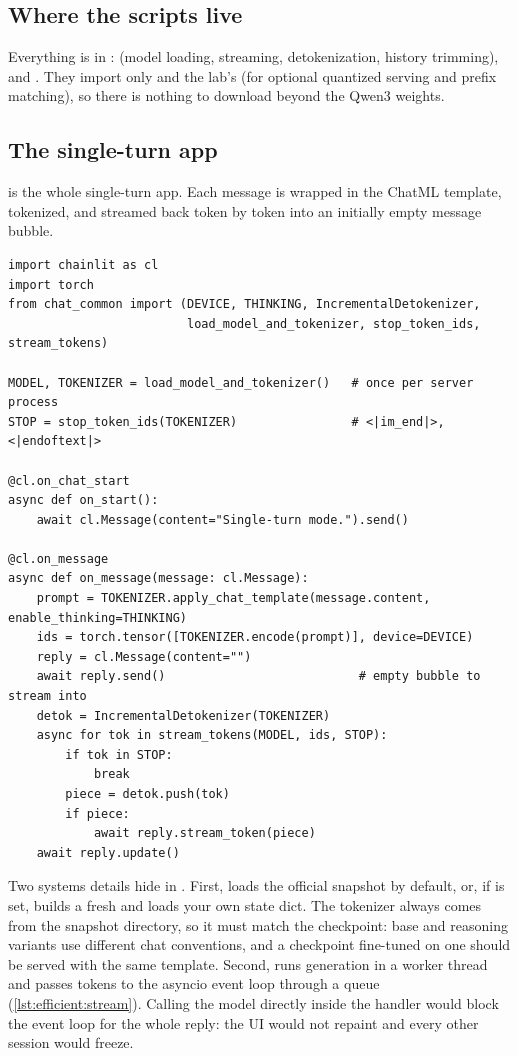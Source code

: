 \subsection{Where the scripts live}
Everything is in :  (model
loading, streaming, detokenization, history trimming),  and
. They import only  and the lab's
 (for optional quantized serving and prefix matching), so there is
nothing to download beyond the Qwen3 weights.

\subsection{The single-turn app}
 is the whole single-turn app. Each message is wrapped in the
ChatML template, tokenized, and streamed back token by token into an initially empty
message bubble.

\begin{lstlisting}[caption={\ident{chat_single_turn.py}: every message is answered
independently.},label={lst:efficient:single}]
import chainlit as cl
import torch
from chat_common import (DEVICE, THINKING, IncrementalDetokenizer,
                         load_model_and_tokenizer, stop_token_ids, stream_tokens)

MODEL, TOKENIZER = load_model_and_tokenizer()   # once per server process
STOP = stop_token_ids(TOKENIZER)                # <|im_end|>, <|endoftext|>

@cl.on_chat_start
async def on_start():
    await cl.Message(content="Single-turn mode.").send()

@cl.on_message
async def on_message(message: cl.Message):
    prompt = TOKENIZER.apply_chat_template(message.content, enable_thinking=THINKING)
    ids = torch.tensor([TOKENIZER.encode(prompt)], device=DEVICE)
    reply = cl.Message(content="")
    await reply.send()                           # empty bubble to stream into
    detok = IncrementalDetokenizer(TOKENIZER)
    async for tok in stream_tokens(MODEL, ids, STOP):
        if tok in STOP:
            break
        piece = detok.push(tok)
        if piece:
            await reply.stream_token(piece)
    await reply.update()
\end{lstlisting}

Two systems details hide in . First, 
loads the official snapshot by default, or, if  is set, builds a
fresh  and loads your own state dict. The tokenizer always comes from
the snapshot directory, so it must match the checkpoint: base and reasoning variants
use different chat conventions, and a checkpoint fine-tuned on one should be served
with the same template. Second,  runs generation in a worker thread
and passes tokens to the asyncio event loop through a queue
(\cref{lst:efficient:stream}). Calling the model directly inside the  handler
would block the event loop for the whole reply: the UI would not repaint and every
other session would freeze.


